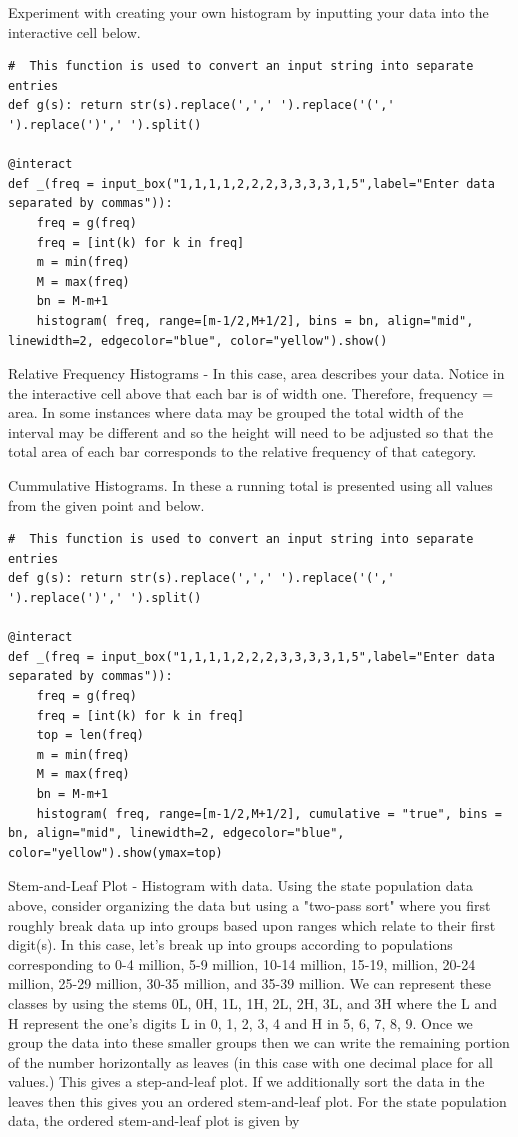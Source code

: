 \documentclass[10pt,]{book}
\theoremstyle{plain}
\theoremstyle{definition}
\theoremstyle{definition}
\theoremstyle{definition}
\numberwithin{equation}{section}
\begin{document}
		
		
%
\par
Experiment with creating your own histogram by inputting your data into the interactive cell below.
\begin{lstlisting}[style=sageinput]
#  This function is used to convert an input string into separate entries
def g(s): return str(s).replace(',',' ').replace('(',' ').replace(')',' ').split()

@interact
def _(freq = input_box("1,1,1,1,2,2,2,3,3,3,3,1,5",label="Enter data separated by commas")):
    freq = g(freq)
    freq = [int(k) for k in freq]
    m = min(freq)
    M = max(freq)
    bn = M-m+1
    histogram( freq, range=[m-1/2,M+1/2], bins = bn, align="mid", linewidth=2, edgecolor="blue", color="yellow").show()
\end{lstlisting}


\par
Relative Frequency Histograms - In this case, area describes your data.  Notice in the interactive cell above that each bar is of width one. Therefore, frequency = area. In some instances where data may be grouped the total width of the interval may be different and so the height will need to be adjusted so that the total area of each bar corresponds to the relative frequency of that category.%
\par
Cummulative Histograms.  In these a running total is presented using all values from the given point and below.
\begin{lstlisting}[style=sageinput]
#  This function is used to convert an input string into separate entries
def g(s): return str(s).replace(',',' ').replace('(',' ').replace(')',' ').split()

@interact
def _(freq = input_box("1,1,1,1,2,2,2,3,3,3,3,1,5",label="Enter data separated by commas")):
    freq = g(freq)
    freq = [int(k) for k in freq]
    top = len(freq)
    m = min(freq)
    M = max(freq)
    bn = M-m+1
    histogram( freq, range=[m-1/2,M+1/2], cumulative = "true", bins = bn, align="mid", linewidth=2, edgecolor="blue", color="yellow").show(ymax=top)
\end{lstlisting}
		
\par
Stem-and-Leaf Plot - Histogram with data. Using the state population data above, consider organizing the data but using a "two-pass sort" where you first roughly break data up into groups based upon ranges which relate to their first digit(s). In this case, let's break up into groups according to populations corresponding to 0-4 million, 5-9 million, 10-14 million, 15-19, million, 20-24 million, 25-29 million, 30-35 million, and 35-39 million. We can represent these classes by using the stems 0L, 0H, 1L, 1H, 2L, 2H, 3L, and 3H where the L and H represent the one's digits L in {0, 1, 2, 3, 4} and H in {5, 6, 7, 8, 9}.  Once we group the data into these smaller groups then we can write the remaining portion of the number horizontally as leaves (in this case with one decimal place for all values.) This gives a step-and-leaf plot. If we additionally sort the data in the leaves then this gives you an ordered stem-and-leaf plot. For the state population data, the ordered stem-and-leaf plot is given by
		
\end{document}

